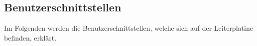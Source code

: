 \clearpage
\subsection{Benutzerschnittstellen}
\label{subsec:Benutzerschnittstellen}

Im Folgenden werden die Benutzerschnittstellen, welche sich auf der Leiterplatine befinden, erklärt.
%
%
% 